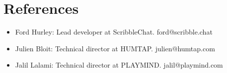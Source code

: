 \documentclass[10pt,a4paper,sans]{moderncv}        %
\begin{document}



\section{References}
\begin{cvcolumns}
  \cvcolumn{}
  {\begin{itemize}
  \item Ford Hurley: Lead developer at ScribbleChat. ford@scribble.chat
  \item Julien Bloit: Technical director at HUMTAP. julien@humtap.com
  \item Jalil Lalami: Technical director at PLAYMIND. jalil@playmind.com
  \end{itemize}}
\end{cvcolumns}
\end{document}
